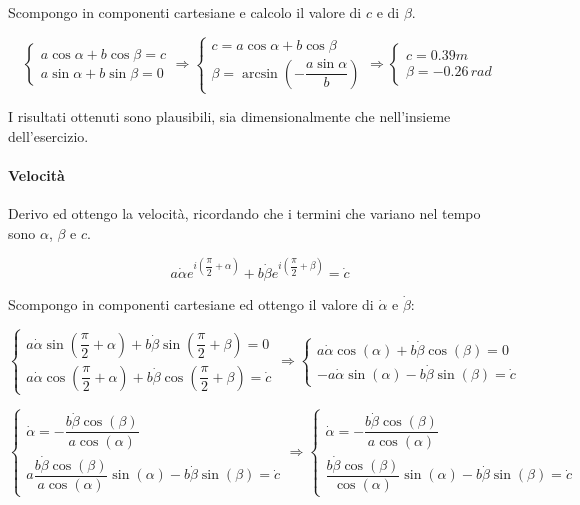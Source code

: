\documentclass[main.tex]{subfiles}
\begin{document}
Scompongo in componenti cartesiane e calcolo il valore di $c$ e di $\beta$.

\[
	\begin{cases}
		a\cos\alpha + b\cos\beta = c\\
		a\sin\alpha + b\sin\beta = 0
	\end{cases}
	\Longrightarrow
	\begin{cases}
		c = a\cos\alpha + b\cos\beta\\
		\beta = \arcsin\left (-\dfrac{a\sin\alpha}{b}\right )
	\end{cases}
	\Longrightarrow
	\begin{cases}
		c = 0.39m\\
		\beta = -0.26\,rad
	\end{cases}
\]

I risultati ottenuti sono plausibili, sia dimensionalmente che nell'insieme dell'esercizio.

\paragraph{Velocità}

Derivo ed ottengo la velocità, ricordando che i termini che variano nel tempo sono $\alpha$, $\beta$ e $c$.

\[
	a\dot{\alpha}e^{i\left (\dfrac{\pi}{2} + \alpha \right )} + b\dot{\beta}e^{i\left (\dfrac{\pi}{2} + \beta \right )} = \dot{c}
\]

Scompongo in componenti cartesiane ed ottengo il valore di $\dot{\alpha}$ e $\dot{\beta}$:

\[
	\begin{cases}
		a\dot{\alpha}\sin\left (\dfrac{\pi}{2} + \alpha \right ) + b\dot{\beta}\sin\left (\dfrac{\pi}{2} + \beta \right ) = 0\\
		a\dot{\alpha}\cos\left (\dfrac{\pi}{2} + \alpha \right ) + b\dot{\beta}\cos\left (\dfrac{\pi}{2} + \beta \right ) = \dot{c}
	\end{cases}
	\Longrightarrow
	\begin{cases}
		a\dot{\alpha}\cos\left (\alpha \right ) + b\dot{\beta}\cos\left (\beta \right ) = 0\\
		-a\dot{\alpha}\sin\left (\alpha \right ) - b\dot{\beta}\sin\left (\beta \right ) = \dot{c}
	\end{cases}
\]

\[
\begin{cases}
	\dot{\alpha} = -\dfrac{b\dot{\beta}\cos\left (\beta \right )}{a\cos\left (\alpha \right ) } \\
	a\dfrac{b\dot{\beta}\cos\left (\beta \right )}{a\cos\left (\alpha \right ) }\sin\left (\alpha \right ) - b\dot{\beta}\sin\left (\beta \right ) = \dot{c}
\end{cases}
\Longrightarrow
\begin{cases}
	\dot{\alpha} = -\dfrac{b\dot{\beta}\cos\left (\beta \right )}{a\cos\left (\alpha \right ) } \\
	\dfrac{b\dot{\beta}\cos\left (\beta \right )}{\cos\left (\alpha \right ) }\sin\left (\alpha \right ) - b\dot{\beta}\sin\left (\beta \right ) = \dot{c}
\end{cases}
\]
\end{document}
